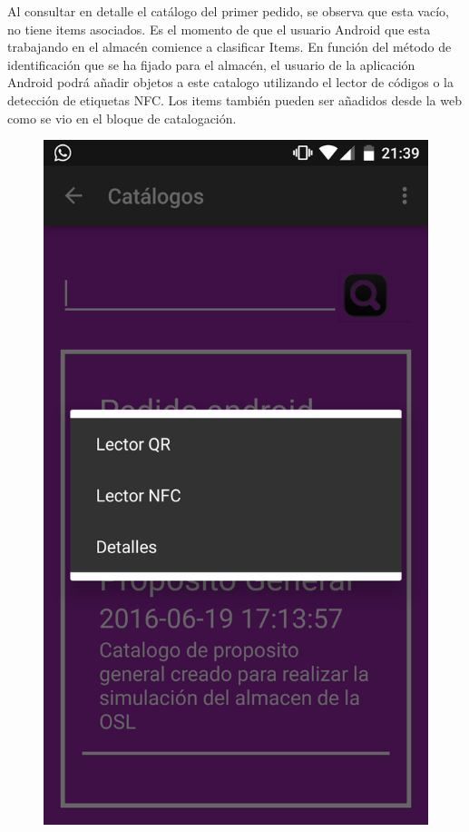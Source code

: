 \documentclass[a4paper,11pt]{book}
\begin{document}
Al consultar en detalle el catálogo del primer pedido, se observa que esta vacío, no tiene items asociados. Es el momento de que el usuario Android que esta trabajando en el almacén comience a clasificar Items. En función del método de identificación que se ha fijado para el almacén, el usuario de la aplicación Android podrá añadir objetos a este catalogo utilizando el lector de códigos o la detección de etiquetas NFC.  Los items también pueden ser añadidos desde la web como se vio en el bloque de catalogación.  

\begin{figure}[H]
  \includegraphics[width=\linewidth]{imagenes/pruebas/movil/movil13.png}

\end{figure}
\end{document}
